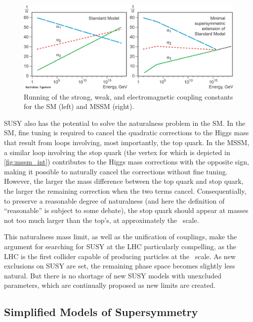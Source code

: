 \begin{centering}
\begin{figure}[!hbt]
\myfloatalign
\includegraphics[width=.9\linewidth]{figures/theory/phypub4highen.jpg}
\caption{Running of the strong, weak, and electromagnetic coupling constants for the \ac{SM} (left) and \ac{MSSM} (right). \cite{nobel2004}}
\label{fig:gut_mssm}
\end{figure}
\end{centering}

\ac{SUSY} also has the potential to solve the naturalness problem in the \ac{SM}. In the \ac{SM}, fine tuning is required to cancel the quadratic corrections to the Higgs mass that result from loops involving, most importantly, the top quark. In the \ac{MSSM}, a similar loop involving the stop quark (the vertex for which is depicted in \autoref{fig:mssm_int}) contributes to the Higgs mass corrections with the opposite sign, making it possible to naturally cancel the corrections without fine tuning. However, the larger the mass difference between the top quark and stop quark, the larger the remaining correction when the two terms cancel. Consequentially, to preserve a reasonable degree of naturalness (and here the definition of ``reasonable'' is subject to some debate), the stop quark should appear at masses not too much larger than the top's, at approximately the \tev~scale. 

This naturalness mass limit, as well as the unification of couplings, make the argument for searching for \ac{SUSY} at the \ac{LHC} particularly compelling, as the \ac{LHC} is the first collider capable of producing particles at the \tev~scale. As new exclusions on \ac{SUSY} are set, the remaining phase space becomes slightly less natural. But there is no shortage of new \ac{SUSY} models with unexcluded parameters, which are continually proposed as new limits are created. 

\subsection{Simplified Models of Supersymmetry}
\label{sec:simplified_models}


